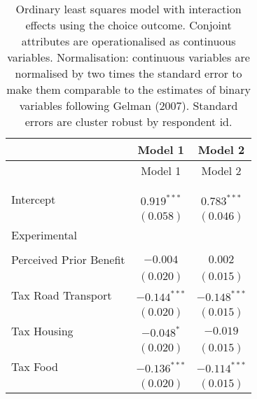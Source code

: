 
\begin{center}
\begin{tiny}
\begin{longtable}{l@{} c@{} c@{}}
\hline
 & Model 1 & Model 2 \\
\hline
\endfirsthead
\hline
 & Model 1 & Model 2 \\
\hline
\endhead
\hline
\endfoot
\hline
\multicolumn{3}{l}{\tiny{$^{***}p<0.001$; $^{**}p<0.01$; $^{*}p<0.05$; $^{\cdot}p<0.1$}}\\
\caption{Ordinary least squares model with interaction effects using the choice outcome. Conjoint attributes are operationalised as continuous variables. Normalisation: continuous variables are normalised by two times
               the standard error to make them comparable to the estimates of binary variables following Gelman (2007). Standard errors are cluster robust by respondent id.}
\label{table:linear_interactions_exp_continuous_choice}
\endlastfoot \\
Intercept                                                & $0.919^{***}$   & $0.783^{***}$  \\
                                                         & $(0.058)$       & $(0.046)$      \\
Experimental                                             &                 &                \\
                                                         &                 &                \\
\quad Perceived Prior Benefit                            & $-0.004$        & $0.002$        \\
                                                         & $(0.020)$       & $(0.015)$      \\
\quad Tax Road Transport                                 & $-0.144^{***}$  & $-0.148^{***}$ \\
                                                         & $(0.020)$       & $(0.015)$      \\
\quad Tax Housing                                        & $-0.048^{*}$    & $-0.019$       \\
                                                         & $(0.020)$       & $(0.015)$      \\
\quad Tax Food                                           & $-0.136^{***}$  & $-0.114^{***}$ \\
                                                         & $(0.020)$       & $(0.015)$      \\

\end{longtable}
\end{tiny}
\end{center}
